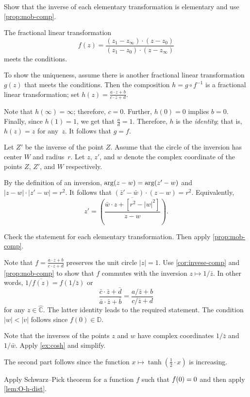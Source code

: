 \begin{multicols}{2}
Show that the inverse of each elementary transformation is elementary
and use \ref{prop:mob-comp}.

The fractional linear transformation
\[f(z)=\frac{(z_1-z_\infty)\cdot(z-z_0)}{(z_1-z_0)\cdot(z-z_\infty)}\]
meets the conditions.

To show the uniqueness, assume there is another fractional linear transformation
$g(z)$ that meets the conditions.
Then the composition
$h=g\circ f^{-1}$ 
is a fractional linear transformation; set
$h(z)=\tfrac{a\cdot z+b}{c\cdot z+d}$.

Note that $h(\infty)=\infty$;
therefore, $c=0$.
Further, $h(0)=0$ implies $b=0$.
Finally, since $h(1)=1$, we get that $\tfrac ad=1$.
Therefore, $h$ is the \emph{identity};
that is, $h(z)=z$ for any~$z$.
It follows that $g=f$.

Let $Z'$ be the inverse of the point $Z$.
Assume that the circle of the inversion has center $W$ and radius~$r$.
Let $z$, $z'$, and $w$ denote the complex coordinate of the points $Z$, $Z'$, and $W$ respectively.

By the definition of an inversion, $\arg (z\z-w)\z=\arg (z'-w)$ and
$|z-w|\cdot|z'-w|=r^2$.
It follows that $(\bar z'-\bar w)\cdot ( z- w)= r^2$.
Equivalently,
\[z'=\overline{\left(\frac{\bar w\cdot z+[r^2-|w|^2]}{z- w}\right)}.\]

 
Check the statement for each elementary transformation.
Then apply \ref{prop:mob-comp}.

Note that $f=\tfrac{a\cdot z+b}{c\cdot z+d}$ preserves the unit circle $|z|=1$.
Use \ref{cor:invese-comp} and \ref{prop:mob-comp} to show that $f$ commutes with the inversion $z\mapsto 1/\bar z$.
In other words, $1/\overline{f(z)}=f(1/\bar z)$ or
\[\frac{\bar c\cdot \bar z+\bar d}{\bar a\cdot \bar z+\bar b}
=\frac{a/\bar z+b}{c/\bar z+d}\]
for any $z\in\hat{\mathbb{C}}$.
The latter identity leads to the required statement. 
The condition $|w|<|v|$ follows since $f(0)\in\mathbb{D}$.

Note that the inverses of the points $z$ and $w$ have complex coordinates $1/\bar z$ and $1/\bar w$.
Apply \ref{ex:cosh} and simplify.

The second part follows since the function $x\mapsto \tanh(\tfrac12\cdot x)$ is increasing.

Apply Schwarz--Pick theorem for a function $f$ such that $f(0)\z=0$ and then apply \ref{lem:O-h-dist}.


\end{multicols}
